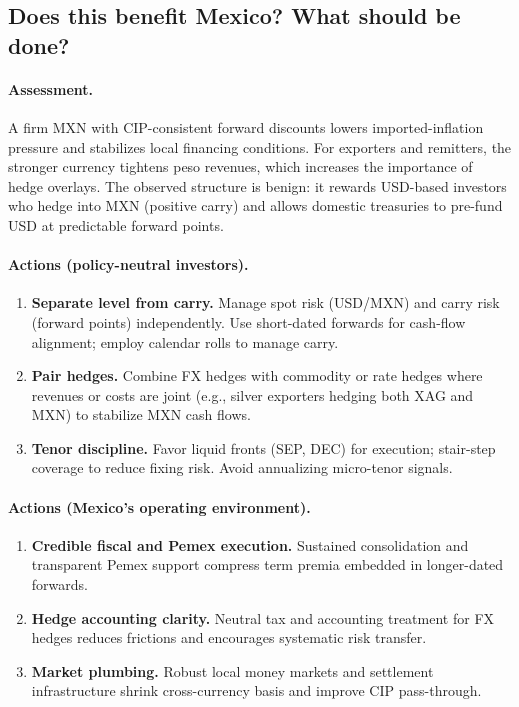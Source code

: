\documentclass[10pt,a4paper]{article} %
\begin{document}
\subsection{Does this benefit Mexico? What should be done?}
\paragraph{Assessment.}
A firm MXN with CIP-consistent forward discounts lowers imported-inflation pressure and stabilizes local financing conditions. For exporters and remitters, the stronger currency tightens peso revenues, which increases the importance of hedge overlays. The observed structure is benign: it rewards USD-based investors who hedge into MXN (positive carry) and allows domestic treasuries to pre-fund USD at predictable forward points.

\paragraph{Actions (policy-neutral investors).}
\begin{enumerate}
  \item \textbf{Separate level from carry.} Manage spot risk (USD/MXN) and carry risk (forward points) independently. Use short-dated forwards for cash-flow alignment; employ calendar rolls to manage carry.
  \item \textbf{Pair hedges.} Combine FX hedges with commodity or rate hedges where revenues or costs are joint (e.g., silver exporters hedging both XAG and MXN) to stabilize MXN cash flows.
  \item \textbf{Tenor discipline.} Favor liquid fronts (SEP, DEC) for execution; stair-step coverage to reduce fixing risk. Avoid annualizing micro-tenor signals.
\end{enumerate}

\paragraph{Actions (Mexico’s operating environment).}
\begin{enumerate}
  \item \textbf{Credible fiscal and Pemex execution.} Sustained consolidation and transparent Pemex support compress term premia embedded in longer-dated forwards.
  \item \textbf{Hedge accounting clarity.} Neutral tax and accounting treatment for FX hedges reduces frictions and encourages systematic risk transfer.
  \item \textbf{Market plumbing.} Robust local money markets and settlement infrastructure shrink cross-currency basis and improve CIP pass-through.
\end{enumerate}
\end{document}

